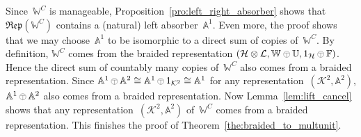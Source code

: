 \documentclass[a4paper]{amsart}
\numberwithin{equation}{section}
\theoremstyle{plain}
\numberwithin{theorem}{section}
\theoremstyle{definition}
\theoremstyle{remark}
\newcommand{\tenscorep}{\mathbin{\begin{tikzpicture}[baseline,x=.75ex,y=.75ex] \draw[line width=.2pt] (-0.8,1.15)--(0.8,1.15);\draw[line width=.2pt](0,-0.25)--(0,1.15); \draw[line width=.2pt] (0,0.75) circle [radius = 1];\end{tikzpicture}}}
\newcommand*{\Corep}[1]{\mathbb{#1}}          %
\newcommand*{\Corepcat}[1]{\mathfrak{Rep}(#1)}%
\newcommand*{\Multunit}[1][]{\mathbb W^{#1}}%
\newcommand*{\BrMultunit}{\mathbb F}%
\newcommand*{\Hils}[1][H]{\mathcal{#1}}%
\begin{document}
Since~\(\Multunit[C]\)
is manageable, Proposition~\ref{pro:left_right_absorber} shows
that~\(\Corepcat{\Multunit[C]}\)
contains a (natural) left absorber~\(\Corep{A}^1\).
Even more, the proof shows that we may choose~\(\Corep{A}^1\)
to be isomorphic to a direct sum of copies of~\(\Multunit[C]\).
By definition, \(\Multunit[C]\)
comes from the braided representation
\((\Hils\otimes\Hils[L], \Multunit \tenscorep \Corep{U}, 1_{\Hils}
\tenscorep \BrMultunit)\).
Hence the direct sum of countably many copies of~\(\Multunit[C]\)
also comes from a braided representation.  Since
\(\Corep{A}^1\tenscorep\Corep{A}^2 \cong \Corep{A}^1 \tenscorep
1_{\Hils[K]^2} \cong \Corep{A}^1\)
for any representation~\((\Hils[K]^2,\Corep{A}^2)\),
\(\Corep{A}^1\tenscorep\Corep{A}^2\)
also comes from a braided representation.  Now
Lemma~\ref{lem:lift_cancel} shows that any
representation~\((\Hils[K]^2,\Corep{A}^2)\)
of~\(\Multunit[C]\)
comes from a braided representation.  This finishes the proof of
Theorem~\ref{the:braided_to_multunit}.

\begin{bibdiv}
  \begin{biblist}
  \end{biblist}
\end{bibdiv}
\end{document}

